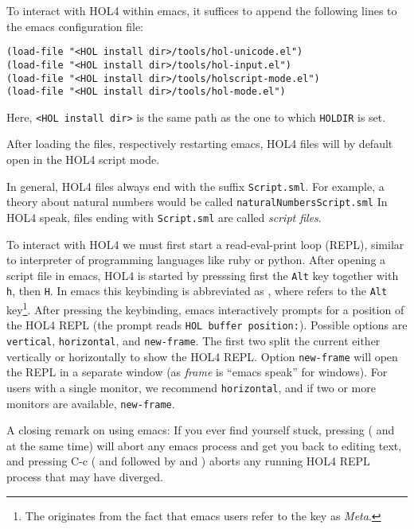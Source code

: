 To interact with HOL4 within emacs, it suffices to append the following lines to
the emacs configuration file:
\begin{lstlisting}
(load-file "<HOL install dir>/tools/hol-unicode.el")
(load-file "<HOL install dir>/tools/hol-input.el")
(load-file "<HOL install dir>/tools/holscript-mode.el")
(load-file "<HOL install dir>/tools/hol-mode.el")
\end{lstlisting}
\noindent Here, \lstinline{<HOL install dir>} is the same path as the one
to which \texttt{HOLDIR} is set.

After loading the files, respectively restarting emacs, HOL4 files will by
default open in the HOL4 script mode.

In general, HOL4 files always end with the suffix \texttt{Script.sml}.
For example, a theory about natural numbers would be called
\texttt{naturalNumbersScript.sml}
In HOL4 speak, files ending with \texttt{Script.sml} are called \emph{script files}.

To interact with HOL4 we must first start a read-eval-print loop (REPL), similar
to interpreter of programming languages like ruby or python.
After opening a script file in emacs, HOL4 is started by presssing
first the \texttt{Alt} key together with \texttt{h}, then \texttt{H}.
In emacs this keybinding is abbreviated as , where  refers
to the \texttt{Alt} key\footnote{The  originates from the fact that
  emacs users refer to the  key as \emph{Meta}.}.
After pressing the keybinding, emacs interactively prompts for a position of
the HOL4 REPL (the prompt reads \lstinline{HOL buffer position:}).
Possible options are \texttt{vertical}, \texttt{horizontal}, and
\texttt{new-frame}.
The first two split the current either vertically or horizontally to show the
HOL4 REPL.
Option \texttt{new-frame} will open the REPL in a separate window (as
\emph{frame} is ``emacs speak'' for windows).
For users with a single monitor, we recommend \texttt{horizontal}, and if two
or more monitors are available, \texttt{new-frame}.

A closing remark on using emacs:
If you ever find yourself stuck, pressing  ( and
 at the same time) will abort any emacs process and get you back to
editing text, and pressing  {C-c} ( and  followed by
 and ) aborts any running HOL4 REPL process that may have
diverged.
